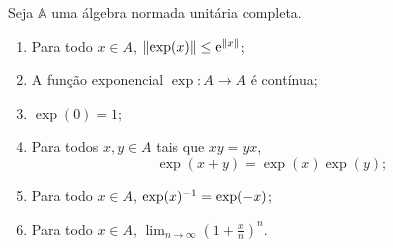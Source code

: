 \begin{proposition}
Seja $\mathbb A$ uma álgebra normada unitária completa.
	\begin{enumerate}
	\item Para todo $x \in A$, $\left\Vert{\exp(x)}\right\Vert \leq \mathrm{e}^{\left\Vert{x}\right\Vert}$;
	\item A função exponencial $\exp\colon A \to A$ é contínua;
	\item $\exp(0) = 1$;
	\item Para todos $x,y \in A$ tais que $xy=yx$,
		\begin{equation*}
		\exp(x+y) = \exp(x)\exp(y);
		\end{equation*}
	\item Para todo $x \in A$, $\exp(x)^{-1} = \exp(-x)$;
	\item Para todo $x \in A$, $\lim_{n \to \infty} \left( 1 + \frac{x}{n} \right)^n$.
	\end{enumerate}
\end{proposition}
